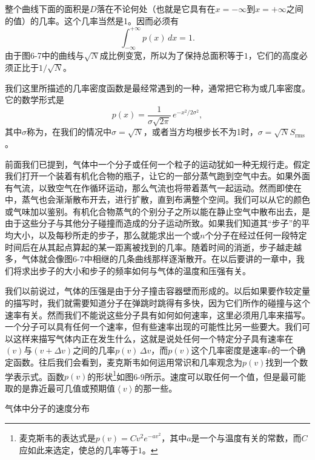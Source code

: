 \documentclass[12pt,oneside]{book}
\begin{document}
\begin{common-format}
整个曲线下面的面积是$D$落在不论何处（也就是它具有在$x=-\infty$到$x=+\infty$之间的值）的几率。这个几率当然是1。因而必须有
\begin{equation}
\label{Eq:I:6:19}
\int_{-\infty}^{+\infty}p(x)\,dx=1.
\end{equation}
由于图6-7中的曲线与$\sqrt{N}$成比例变宽，所以为了保持总面积等于$1$，它们的高度必须正比于$1/\sqrt{N}$。

我们这里所描述的几率密度函数是最经常遇到的一种，通常把它称为或几率密度。它的数学形式是
\begin{equation}
\label{Eq:I:6:20}
p(x)=\frac{1}{\sigma\sqrt{2\pi}}\,e^{-x^2/2\sigma^2},
\end{equation}
其中$\sigma$称为，在我们的情况中$\sigma=\sqrt{N}$，或者当方均根步长不为1时，$\sigma=\sqrt{N}S_{\text{rms}}$。

前面我们已提到，气体中一个分子或任何一个粒子的运动犹如一种无规行走。假定我们打开一个装着有机化合物的瓶子，让它的一部分蒸气跑到空气中去。如果外面有气流，以致空气在作循环运动，那么气流也将带着蒸气一起运动。然而即使在中，蒸气也会渐渐散布开去，进行扩散，直到布满整个空间。我们可以从它的颜色或气味加以鉴别。有机化合物蒸气的个别分子之所以能在静止空气中散布出去，是由于这些分子与其他分子碰撞而造成的分子运动所致。如果我们知道其“步子”的平均大小，以及每秒所走的步子，那么就能求出一个或$n$个分子在经过任何一段特定时间后在从其起点算起的某一距离被找到的几率。随着时间的消逝，步子越走越多，气体就会像图6-7中相继的几条曲线那样逐渐散开。在以后要讲的一章中，我们将求出步子的大小和步子的频率如何与气体的温度和压强有关。

我们以前说过，气体的压强是由于分子撞击容器壁而形成的。以后如果要作较定量的描写时，我们就需要知道分子在弹跳时跳得有多快，因为它们所作的碰撞与这个速率有关。然而我们不能说这些分子具有如何如何速率，这里必须用几率来描写。一个分子可以具有任何一个速率，但有些速率出现的可能性比另一些要大。我们可以这样来描写气体内正在发生什么，这就是说处任何一个特定分子具有速率在$(v)$与$(v+\Delta v)$之间的几率$p(v)\,\Delta v$，而$p(v)$这个几率密度是速率$v$的一个确定函数。往后我们会看到，麦克斯韦如何运用常识和几率观念为$p(v)$找到一个数学表示式。函数$p(v)$的形状\footnote{麦克斯韦的表达式是$p(v)=Cv^2e^{-av^2}$，其中$a$是一个与温度有关的常数，而$C$应如此来选定，使总的几率等于$1$。}如图6-9所示。速度可以取任何一个值，但是最可能取的是靠近最可几值或预期值$\left < v \right >$的那一些。
\begin{fig}{气体中分子的速度分布}
\caption{气体中分子的速度分布}
\label{fig:气体中分子的速度分布}
\end{fig}


\end{common-format}
\end{document}

